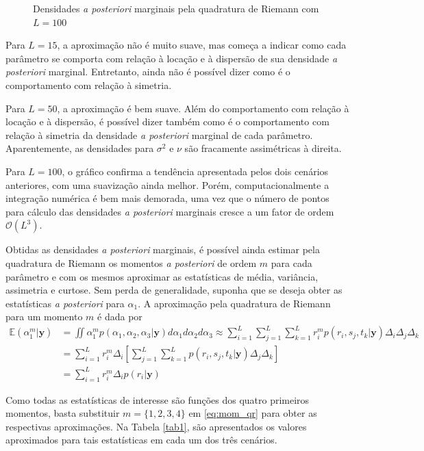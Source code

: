 \begin{figure}[t]
	\caption{Densidades \textit{a posteriori} marginais pela quadratura de Riemann com $L = 100$}%
\end{figure}

Para $L=15$, a aproximação não é muito suave, mas começa a indicar como cada parâmetro se comporta com relação à locação e à dispersão de sua densidade \textit{a posteriori} marginal. Entretanto, ainda não é possível dizer como é o comportamento com relação à simetria.

Para $L=50$, a aproximação é bem suave. Além do comportamento com relação à locação e à dispersão, é possível dizer também como é o comportamento com relação à simetria da densidade \textit{a posteriori} marginal de cada parâmetro. Aparentemente, as densidades para $\sigma^2$ e $\nu$ são fracamente assimétricas à direita.

Para $L=100$, o gráfico confirma a tendência apresentada pelos dois cenários anteriores, com uma suavização ainda melhor. Porém, computacionalmente a integração numérica é bem mais demorada, uma vez que o número de pontos para cálculo das densidades \textit{a posteriori} marginais cresce a um fator de ordem $\mathcal{O}(L^3)$.

Obtidas as densidades \textit{a posteriori} marginais, é possível ainda estimar pela quadratura de Riemann os momentos \textit{a posteriori} de ordem $m$ para cada parâmetro e com os mesmos aproximar as estatísticas de média, variância, assimetria e curtose. Sem perda de generalidade, suponha que se deseja obter as estatísticas \textit{a posteriori} para $\alpha_1$. A aproximação pela quadratura de Riemann para um momento $m$ é dada por
\begin{align}
\mathbb{E}(\alpha_1^m | \bm{y}) &= \iint \alpha_1^m p(\alpha_1, \alpha_2, \alpha_3 | \bm{y}) d\alpha_1 d\alpha_2 d\alpha_3 \approx \sum_{i=1}^{L} \sum_{j=1}^{L} \sum_{k=1}^{L} r_i^m p(r_i, s_j, t_k | \bm{y}) \Delta_i \Delta_j \Delta_k \nonumber \\
&= \sum_{i=1}^{L} r_i^m \Delta_i \left[\sum_{j=1}^{L} \sum_{k=1}^{L} p(r_i, s_j, t_k | \bm{y}) \Delta_j \Delta_k\right] \nonumber \\
&= \sum_{i=1}^{L} r_i^m \Delta_i p(r_i | \bm{y}) \label{eq:mom_qr}
\end{align}

Como todas as estatísticas de interesse são funções dos quatro primeiros momentos, basta substituir $m = \{1, 2, 3, 4\}$ em \eqref{eq:mom_qr} para obter as respectivas aproximações. Na Tabela \ref{tab1}, são apresentados os valores aproximados para tais estatísticas em cada um dos três cenários.

